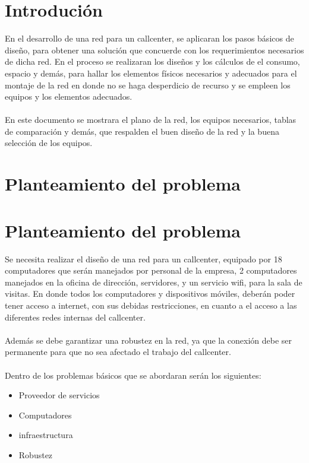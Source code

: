 \documentclass[12pt]{article}
\begin{document}
\maketitle
\pagebreak

\tableofcontents

\pagebreak 
\section{\textbf{Introduci\'on}}
En el desarrollo de una red para un callcenter, se aplicaran los pasos básicos de diseño, para obtener una solución que concuerde con los requerimientos necesarios de dicha red. En el proceso se realizaran los diseños y los cálculos de el consumo, espacio y demás, para hallar los elementos físicos necesarios y adecuados para el montaje de la red en donde no se haga desperdicio de recurso y se empleen los equipos y los elementos adecuados.\\\\

En este documento se mostrara el plano de la red, los equipos necesarios, tablas de comparación y demás, que respalden el buen diseño de la red y la buena selección de los equipos.

\pagebreak
\section{\textbf{Planteamiento del problema}}
\section{\textbf{Planteamiento del problema}}
Se necesita realizar el diseño de una red para un callcenter, equipado por 18 computadores que serán manejados por personal de la empresa, 2 computadores manejados en la oficina de dirección, servidores, y un servicio wifi, para la sala de visitas. En donde todos los computadores y dispositivos móviles, deberán poder tener acceso a internet, con sus debidas restricciones, en cuanto a el acceso a las diferentes redes internas del callcenter.\\\\
Además se debe garantizar una robustez en la red, ya que la conexión debe ser permanente para que no sea afectado el trabajo del callcenter.\\\\
Dentro de los problemas básicos que se abordaran serán los siguientes:
\begin{itemize}
\item
Proveedor de servicios
\item
Computadores
\item
infraestructura
\item
Robustez
\end{itemize}
\end{document}
